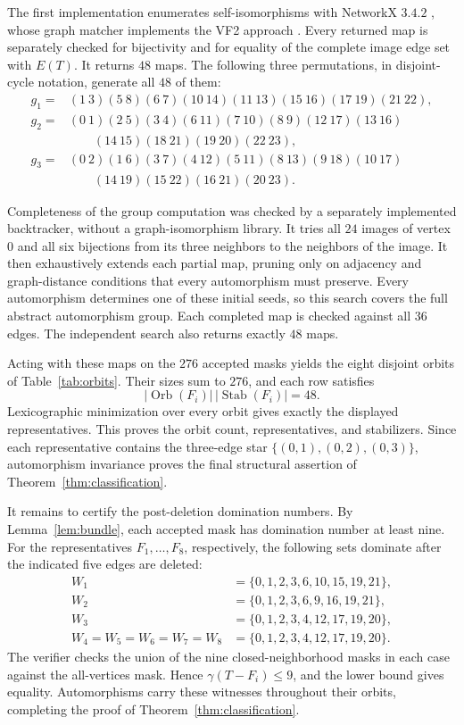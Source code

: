 \documentclass[11pt]{article}
\newcommand{\Orb}{\operatorname{Orb}}
\newcommand{\Stab}{\operatorname{Stab}}
\begin{document}
The first implementation enumerates self-isomorphisms with NetworkX
$3.4.2$ \cite{Hagberg2008NetworkX}, whose graph matcher implements the
VF2 approach \cite{Cordella2004VF2}.  Every returned map is separately
checked for bijectivity and for equality of the complete image edge set
with $E(T)$.  It returns $48$ maps.  The following three permutations,
in disjoint-cycle notation, generate all $48$ of them:
\begin{align*}
g_1={}&(1\ 3)(5\ 8)(6\ 7)(10\ 14)(11\ 13)(15\ 16)(17\ 19)(21\ 22),\\
g_2={}&(0\ 1)(2\ 5)(3\ 4)(6\ 11)(7\ 10)(8\ 9)(12\ 17)(13\ 16)\\
     &\qquad(14\ 15)(18\ 21)(19\ 20)(22\ 23),\\
g_3={}&(0\ 2)(1\ 6)(3\ 7)(4\ 12)(5\ 11)(8\ 13)(9\ 18)(10\ 17)\\
     &\qquad(14\ 19)(15\ 22)(16\ 21)(20\ 23).
\end{align*}

Completeness of the group computation was checked by a separately
implemented backtracker, without a graph-isomorphism library.  It tries
all $24$ images of vertex $0$ and all six bijections from its three
neighbors to the neighbors of the image.  It then exhaustively extends
each partial map, pruning only on adjacency and graph-distance
conditions that every automorphism must preserve.  Every automorphism
determines one of these initial seeds, so this search covers the full
abstract automorphism group.  Each completed map is checked against all
$36$ edges.  The independent search also returns exactly $48$ maps.

Acting with these maps on the $276$ accepted masks yields the eight
disjoint orbits of Table~\ref{tab:orbits}.  Their sizes sum to $276$, and
each row satisfies
\[
 |\Orb(F_i)|\,|\Stab(F_i)|=48.
\]
Lexicographic minimization over every orbit gives exactly the displayed
representatives.  This proves the orbit count, representatives, and
stabilizers.  Since each representative contains the three-edge star
$\{(0,1),(0,2),(0,3)\}$, automorphism invariance proves the final
structural assertion of Theorem~\ref{thm:classification}.

It remains to certify the post-deletion domination numbers.  By
Lemma~\ref{lem:bundle}, each accepted mask has domination number at least
nine.  For the representatives $F_1,\ldots,F_8$, respectively, the
following sets dominate after the indicated five edges are deleted:
\begin{align*}
W_1&=\{0,1,2,3,6,10,15,19,21\},\\
W_2&=\{0,1,2,3,6,9,16,19,21\},\\
W_3&=\{0,1,2,3,4,12,17,19,20\},\\
W_4=W_5=W_6=W_7=W_8
   &=\{0,1,2,3,4,12,17,19,20\}.
\end{align*}
The verifier checks the union of the nine closed-neighborhood masks in
each case against the all-vertices mask.  Hence
$\gamma(T-F_i)\leq 9$, and the lower bound gives equality.
Automorphisms carry these witnesses throughout their orbits, completing
the proof of Theorem~\ref{thm:classification}.
\end{document}
